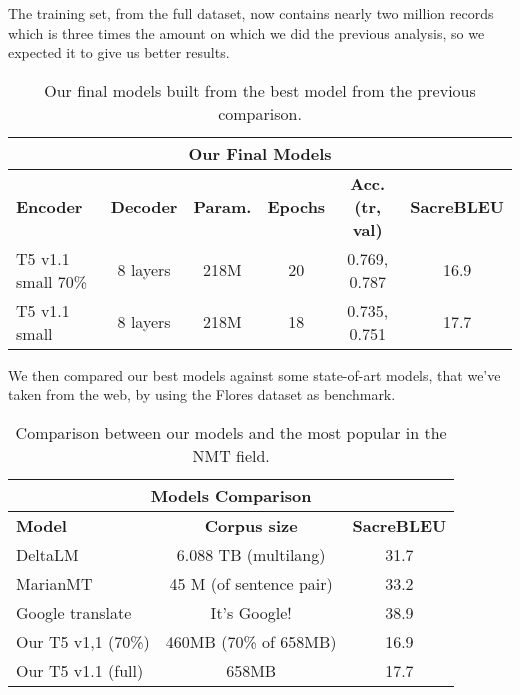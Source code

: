 The training set, from the full dataset, now contains nearly two million records which is three times the amount on which we did the previous analysis, so we expected it to give us better results.

\begin{table}[H]
\centering
\begin{tabular}{l|c|c|c|c|c}\hline \hline
\multicolumn{6}{c}{\textbf{Our Final Models}} \\\hline
\textbf{Encoder} & \textbf{Decoder} & \textbf{Param.} & \textbf{Epochs} & \textbf{Acc. (tr, val)} & \textbf{SacreBLEU}\\\hline
T5 v1.1 small 70\% & 8 layers & 218M & 20 & 0.769, 0.787 & 16.9\\
T5 v1.1 small & 8 layers & 218M & 18 & 0.735, 0.751 & 17.7\\\hline \hline 
\end{tabular}
\caption{Our final models built from the best model from the previous comparison.}
\end{table}
We then compared our best models against some state-of-art models, that we've taken from the web, by using the Flores dataset as benchmark.
\begin{table}[H]
\centering
\begin{tabular}{l|c|c}\hline \hline
\multicolumn{3}{c}{\textbf{Models Comparison}} \\\hline
\textbf{Model} & \multicolumn{1}{c|}{\textbf{Corpus size}} & \multicolumn{1}{c}{\textbf{SacreBLEU}}\\\hline
DeltaLM & 6.088 TB (multilang) & 31.7 \\
MarianMT & 45 M (of sentence pair) & 33.2 \\
Google translate & It's Google! & 38.9\\
Our T5 v1,1 (70\%) & 460MB (70\% of 658MB) & 16.9 \\
Our T5 v1.1 (full) & 658MB & 17.7 \\
\hline \hline
\end{tabular}
\caption{Comparison between our models and the most popular in the NMT field.}
\label{table:final_comparison}
\end{table}

